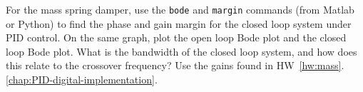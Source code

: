 For the mass spring damper, use the \texttt{bode} and \texttt{margin} commands (from Matlab or Python) to find the phase and gain margin for the closed loop system under PID control.  On the same graph, plot the open loop Bode plot and the closed loop Bode plot.  What is the bandwidth of the closed loop system, and how does this relate to the crossover frequency?  Use the gains found in HW~\ref{hw:mass}.\ref{chap:PID-digital-implementation}.
